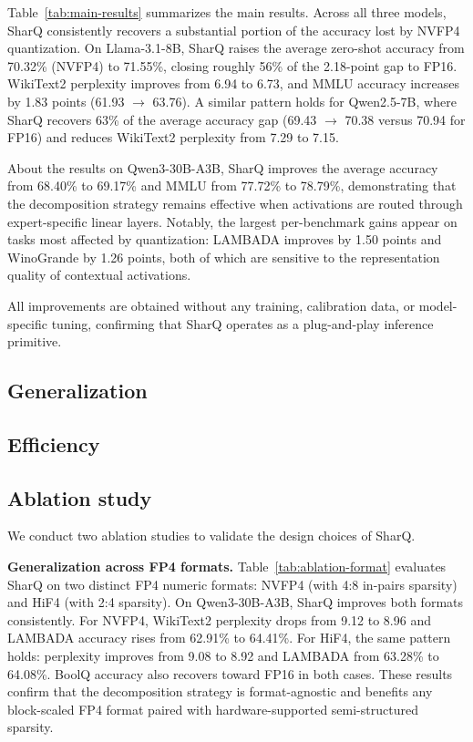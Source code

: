 \documentclass{article}
\begin{document}
Table~\ref{tab:main-results} summarizes the main results. Across all three
models, SharQ consistently recovers a substantial portion of the accuracy lost
by NVFP4 quantization. On Llama-3.1-8B, SharQ raises the average zero-shot
accuracy from 70.32\% (NVFP4) to 71.55\%, closing roughly 56\% of the 2.18-point
gap to FP16. WikiText2 perplexity improves from 6.94 to 6.73, and MMLU accuracy
increases by 1.83 points (61.93 $\to$ 63.76). A similar pattern holds for
Qwen2.5-7B, where SharQ recovers 63\% of the average accuracy gap
(69.43 $\to$ 70.38 versus 70.94 for FP16) and reduces WikiText2 perplexity from
7.29 to 7.15.

About the results on Qwen3-30B-A3B, SharQ improves the average accuracy from 68.40\% to 69.17\% and MMLU from
77.72\% to 78.79\%, demonstrating that the decomposition strategy remains
effective when activations are routed through expert-specific linear layers.
Notably, the largest per-benchmark gains appear on tasks most affected by
quantization: LAMBADA improves by 1.50 points and WinoGrande by 1.26 points,
both of which are sensitive to the representation quality of contextual
activations.

All improvements are obtained without any training, calibration data, or
model-specific tuning, confirming that SharQ operates as a plug-and-play
inference primitive.

\subsection{Generalization}

\subsection{Efficiency}

\subsection{Ablation study}

We conduct two ablation studies to validate the design choices of SharQ.

\textbf{Generalization across FP4 formats.}
Table~\ref{tab:ablation-format} evaluates SharQ on two distinct FP4 numeric
formats: NVFP4 (with 4:8 in-pairs sparsity) and HiF4 (with 2:4 sparsity).
On Qwen3-30B-A3B, SharQ improves both formats consistently. For NVFP4,
WikiText2 perplexity drops from 9.12 to 8.96 and LAMBADA accuracy rises from
62.91\% to 64.41\%. For HiF4, the same pattern holds: perplexity improves from
9.08 to 8.92 and LAMBADA from 63.28\% to 64.08\%. BoolQ accuracy also recovers
toward FP16 in both cases. These results confirm that the decomposition strategy
is format-agnostic and benefits any block-scaled FP4 format paired with
hardware-supported semi-structured sparsity.
\end{document}
